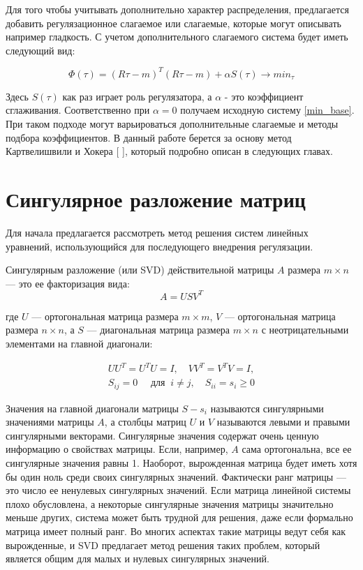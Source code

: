 \documentclass[a4paper,12pt]{diplom}
\renewcommand{\geq}{\geqslant}
\begin{document}
Для того чтобы учитывать дополнительно характер распределения, предлагается добавить регулязационное слагаемое или слагаемые, 
которые могут описывать например гладкость. С учетом дополнительного слагаемого система будет иметь следующий вид: 

\begin{equation}
   \Phi(\tau)=(R\tau-m)^T (R\tau-m) + \alpha S(\tau) \to min_{\tau}
   \label{min_svd}
\end{equation}
  
Здесь $S(\tau)$ как раз играет роль регулязатора, а $\alpha$ - это коэффициент сглаживания. Соответственно при $\alpha = 0$ 
получаем исходную систему \eqref{min_base}. При таком подходе могут варьироваться дополнительные слагаемые и методы подбора коэффициентов. 
В данный работе берется за основу метод Картвелишвили и Хокера [ ], который подробно описан в следующих главах. 



\section{Сингулярное разложение матриц}

Для начала предлагается рассмотреть метод решения систем линейных уравнений, использующийся для последующего внедрения регулязации.

Сингулярным разложение (или SVD) действительной матрицы $A$ размера $m \times n$ — это ее факторизация вида: 
\begin{equation}
    A = U S V^T 
    \label{svd_decomp}
\end{equation}

где $U$ — ортогональная матрица размера $m \times m$, $V$ — ортогональная матрица размера $n \times n$, а $S$ — диагональная матрица размера 
$m \times n$ с неотрицательными элементами на главной диагонали: 

\begin{equation}
    \begin{array}{l}
        U U^T = U^T U = I, \quad VV ^T = V^T V = I, \\
        S_{ij} = 0 \quad \text{ для } \ i \neq j, \quad S_{ii} = s_{i} \geq 0
    \end{array}
\end{equation}

Значения на главной диагонали матрицы $S - s_{i}$  называются сингулярными значениями матрицы $A$, а столбцы матриц $U$ и $V$ называются левыми 
и правыми сингулярными векторами. Сингулярные значения содержат очень ценную информацию о свойствах матрицы. Если, например, 
$A$ сама ортогональна, все ее сингулярные значения равны 1. Наоборот, вырожденная матрица будет иметь хотя бы один ноль среди своих 
сингулярных значений. Фактически ранг матрицы — это число ее ненулевых сингулярных значений. Если матрица линейной системы плохо обусловлена, 
а некоторые сингулярные значения матрицы значительно меньше других, система может быть трудной для решения, даже если формально матрица 
имеет полный ранг. Во многих аспектах такие матрицы ведут себя как вырожденные, и SVD предлагает метод решения таких проблем, который 
является общим для малых и нулевых сингулярных значений.
\end{document}
